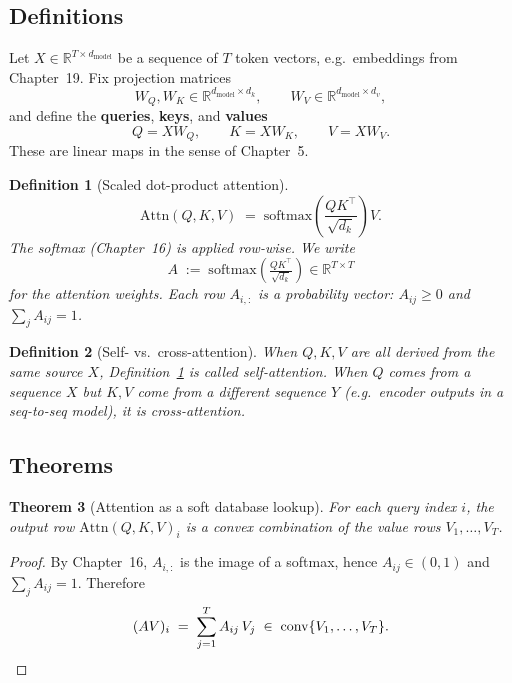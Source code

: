 \documentclass[11pt]{article}
\newtheorem{theorem}{Theorem}[section]
\newtheorem{definition}[theorem]{Definition}
\theoremstyle{remark}
\begin{document}
\subsection*{Definitions}

Let $X \in \mathbb{R}^{T \times d_{\mathrm{model}}}$ be a sequence of $T$ token vectors, e.g.\ embeddings from Chapter~19. Fix projection matrices
\[
W_Q, W_K \in \mathbb{R}^{d_{\mathrm{model}} \times d_k}, \qquad W_V \in \mathbb{R}^{d_{\mathrm{model}} \times d_v},
\]
and define the \textbf{queries}, \textbf{keys}, and \textbf{values}
\[
Q = X W_Q, \qquad K = X W_K, \qquad V = X W_V.
\]
These are linear maps in the sense of Chapter~5.

\begin{definition}[Scaled dot-product attention]
\label{def:sdpa}
\[
\boxed{\,\mathrm{Attn}(Q,K,V) \;=\; \mathrm{softmax}\!\left(\frac{Q K^\top}{\sqrt{d_k}}\right) V.\,}
\]
The softmax (Chapter~16) is applied row-wise. We write
\[
A \;:=\; \mathrm{softmax}\!\left(\tfrac{QK^\top}{\sqrt{d_k}}\right) \in \mathbb{R}^{T \times T}
\]
for the \emph{attention weights}. Each row $A_{i,:}$ is a probability vector: $A_{ij} \ge 0$ and $\sum_j A_{ij} = 1$.
\end{definition}

\begin{definition}[Self- vs.\ cross-attention]
When $Q,K,V$ are all derived from the same source $X$, Definition~\ref{def:sdpa} is called \emph{self-attention}. When $Q$ comes from a sequence $X$ but $K,V$ come from a different sequence $Y$ (e.g.\ encoder outputs in a seq-to-seq model), it is \emph{cross-attention}.
\end{definition}

\subsection*{Theorems}

\begin{theorem}[Attention as a soft database lookup]
For each query index $i$, the output row $\mathrm{Attn}(Q,K,V)_i$ is a convex combination of the value rows $V_1, \dots, V_T$.
\end{theorem}
\begin{proof}
By Chapter~16, $A_{i,:}$ is the image of a softmax, hence $A_{ij} \in (0,1)$ and $\sum_j A_{ij} = 1$. Therefore
\[
(AV)_i \;=\; \sum_{j=1}^{T} A_{ij}\, V_j \;\in\; \mathrm{conv}\{V_1, \dots, V_T\}. \qedhere
\]
\end{proof}
\end{document}
